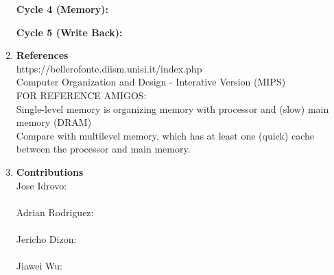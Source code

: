 \documentclass{article}
\begin{document}
\begin{enumerate}
        \textbf{Cycle 4 (Memory):}

        \textbf{Cycle 5 (Write Back):}

        \item \textbf{References}
        \\ https://bellerofonte.diism.unisi.it/index.php
        \\ Computer Organization and Design - Interative Version (MIPS)
        \\ FOR REFERENCE AMIGOS:
        \\  Single-level memory is organizing memory with processor and (slow) main memory (DRAM)
        \\  Compare with multilevel memory, which has at least one (quick) cache between the processor and main memory.
        

        \item \textbf{Contributions}
        \\  Jose Idrovo:
        \\  
        \\  Adrian Rodriguez:
        \\  
        \\  Jericho Dizon:
        \\  
        \\  Jiawei Wu: 

     \end{enumerate}

     
     
     
\end{document}
